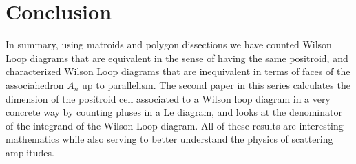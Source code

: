 \documentclass[11pt]{article}
\theoremstyle{remark}
\theoremstyle{definition}
\begin{document}
\section{Conclusion}

In summary, using matroids and polygon dissections we have counted Wilson Loop diagrams that are equivalent in the sense of having the same positroid, and characterized Wilson Loop diagrams that are inequivalent in terms of faces of the associahedron $A_n$ up to parallelism.  The second paper in this series calculates the dimension of the positroid cell associated to a Wilson loop diagram in a very concrete way by counting pluses in a Le diagram, and looks at the denominator of the integrand of the Wilson Loop diagram.  All of these results are interesting mathematics while also serving to better understand the physics of scattering amplitudes.












\end{document}

